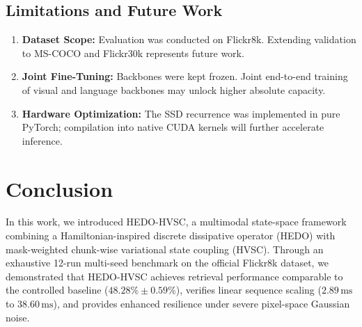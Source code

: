 \documentclass[11pt,journal,onecolumn,draftcls]{IEEEtran}
\begin{document}
\subsection{Limitations and Future Work}
\begin{enumerate}
    \item \textbf{Dataset Scope:} Evaluation was conducted on Flickr8k. Extending validation to MS-COCO \cite{lin2014microsoft} and Flickr30k \cite{young2014image} represents future work.
    \item \textbf{Joint Fine-Tuning:} Backbones were kept frozen. Joint end-to-end training of visual and language backbones may unlock higher absolute capacity.
    \item \textbf{Hardware Optimization:} The SSD recurrence was implemented in pure PyTorch; compilation into native CUDA kernels will further accelerate inference.
\end{enumerate}

\section{Conclusion}
\label{sec:conclusion}
In this work, we introduced HEDO-HVSC, a multimodal state-space framework combining a Hamiltonian-inspired discrete dissipative operator (HEDO) with mask-weighted chunk-wise variational state coupling (HVSC). Through an exhaustive 12-run multi-seed benchmark on the official Flickr8k dataset, we demonstrated that HEDO-HVSC achieves retrieval performance comparable to the controlled baseline ($48.28\% \pm 0.59\%$), verifies linear sequence scaling ($2.89\,\text{ms}$ to $38.60\,\text{ms}$), and provides enhanced resilience under severe pixel-space Gaussian noise.



\end{document}
